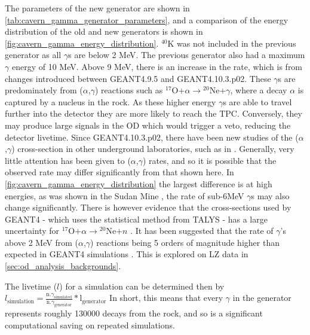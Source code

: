 \par
The parameters of the new generator are shown in \autoref{tab:cavern_gamma_generator_parameters}, and a comparison of the energy distribution of the old and new generators is shown in \autoref{fig:cavern_gamma_energy_distribution}.
$^{40}$K was not included in the previous generator as all $\gamma$s are below 2 MeV.
The previous generator also had a maximum $\gamma$ energy of 10 MeV.
Above 9 MeV, there is an increase in the rate, which is from changes introduced between GEANT4.9.5 and GEANT4.10.3.p02.
These $\gamma$s are predominately from ($\alpha$,$\gamma$) reactions such as ${}^{17}$O$ + \alpha \to {}^{20}$Ne$ + \gamma$, where a decay $\alpha$ is captured by a nucleus in the rock.
As these higher energy $\gamma$s are able to travel further into the detector they are more likely to reach the TPC.
Conversely, they may produce large signals in the OD which would trigger a veto, reducing the detector livetime.
Since GEANT4.10.3.p02, there have been new studies of the ($\alpha$,$\gamma$) cross-section in other underground laboratories, such as in \cite{cavern_gammas_in_Soudan_mine_ref}.
Generally, very little attention has been given to ($\alpha$,$\gamma$) rates, and so it is possible that the observed rate may differ significantly from that shown here. 
In \autoref{fig:cavern_gamma_energy_distribution} the largest difference is at high energies, as was shown in the Sudan Mine \cite{cavern_gammas_in_Soudan_mine_ref}, the rate of sub-6MeV $\gamma$s may also change significantly. 
There is however evidence that the cross-sections used by GEANT4 - which uses the statistical method from TALYS \cite{talys_ref} - has a large uncertainty for ${}^{17}$O$ + \alpha \to {}^{20}$Ne$ + n$ \cite{alpha_gamma_statistical_error_ref}.
It has been suggested that the rate of $\gamma$'s above 2 MeV from ($\alpha$,$\gamma$) reactions being 5 orders of magnitude higher than expected in GEANT4 simulations \cite{soudanmine_counter_point_ref, alpha_gamma_reactions_ref}.
This is explored on LZ data in \autoref{sec:od_analysis_backgrounds}.

\par
The livetime ($l$) for a simulation can be determined then by $l_{\text{simulation}} = \frac{\text{n.} \gamma_{\text{simulated}}}{\text{n.} \gamma_{\text{generator}}} * \text{l}_{\text{generator}}$
In short, this means that every $\gamma$ in the generator represents roughly 130000 decays from the rock, and so is a significant computational saving on repeated simulations.


